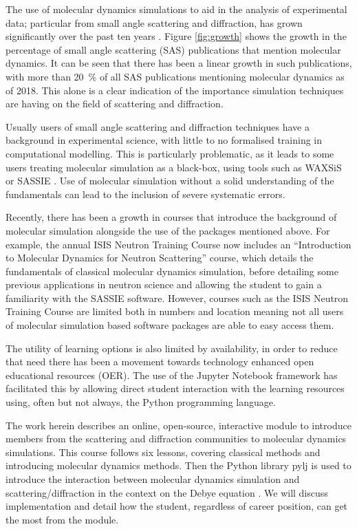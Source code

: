 \documentclass[pdf]{iucr}              %
\begin{document}
The use of molecular dynamics simulations to aid in the analysis of experimental data; particular from small angle scattering and diffraction, has grown significantly over the past ten years \cite{Pan2012,Boldon2015,Hub2018,Ivanovic2018,East2016,Wall2014,Wall2018,Satoh2015}.
Figure \ref{fig:growth} shows the growth in the percentage of small angle scattering (SAS) publications that mention molecular dynamics.
It can be seen that there has been a linear growth in such publications, with more than \SI{20}{\percent} of all SAS publications mentioning molecular dynamics as of 2018.
This alone is a clear indication of the importance simulation techniques are having on the field of scattering and diffraction.

Usually users of small angle scattering and diffraction techniques have a background in experimental science, with little to no formalised training in computational modelling.
This is particularly problematic, as it leads to some users treating molecular simulation as a black-box, using tools such as WAXSiS or SASSIE \cite{Chen2014,Knight2015,Perkins2016}.
Use of molecular simulation without a solid understanding of the fundamentals can lead to the inclusion of severe systematic errors.

Recently, there has been a growth in courses that introduce the background of molecular simulation alongside the use of the packages mentioned above.
For example, the annual ISIS Neutron Training Course now includes an ``Introduction to Molecular Dynamics for Neutron Scattering'' course, which details the fundamentals of classical molecular dynamics simulation, before detailing some previous applications in neutron science and allowing the student to gain a familiarity with the SASSIE software.
However, courses such as the ISIS Neutron Training Course are limited both in numbers and location meaning not all users of molecular simulation based software packages are able to easy access them.

The utility of learning options is also limited by availability, in order to reduce that need there has been a movement towards technology enhanced open educational resources (OER).
The use of the Jupyter Notebook framework \cite{Kluyver2016} has facilitated this by allowing direct student interaction with the learning resources using, often but not always, the Python programming language.

The work herein describes an online, open-source, interactive module to introduce members from the scattering and diffraction communities to molecular dynamics simulations.
This course follows six lessons, covering classical methods and introducing molecular dynamics methods.
Then the Python library pylj \cite{McCluskey2018} is used to introduce the interaction between molecular dynamics simulation and scattering/diffraction in the context on the Debye equation \cite{Debye1915}.
We will discuss implementation and detail how the student, regardless of career position, can get the most from the module.
\end{document}

